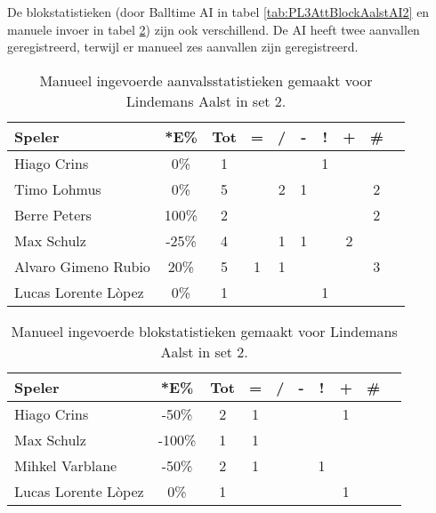 De blokstatistieken (door Balltime AI in tabel \ref{tab:PL3AttBlockAalstAI2} en manuele invoer in tabel \ref{tab:PL3BlockAalstMan2}) zijn ook verschillend. De AI heeft twee aanvallen geregistreerd, terwijl er manueel zes aanvallen zijn geregistreerd. 

\begin{table}[ht!]
    \centering
    \scriptsize
    \begin{tabular}{|l|c|c|c|c|c|c|c|c|c|}
        \hline
        \textbf{Speler} & *E\% & Tot & = & / & - & ! & + & \# \\ \hline
        Hiago Crins & 0\% & 1 &  &  &  & 1 &  & \\ 
        Timo Lohmus & 0\% & 5 &  & 2 & 1 &  & & 2 \\ 
        Berre Peters & 100\% & 2 &  &  & & & & 2 \\ 
        Max Schulz & -25\% & 4 &  & 1 & 1 &  & 2 & \\ 
        Alvaro Gimeno Rubio & 20\% & 5 & 1 & 1 &  &  &  & 3 \\ 
        Lucas Lorente Lòpez & 0\% & 1 &  &  &  & 1 &  & \\ \hline
    \end{tabular}
    \caption[Manueel ingevoerde aanvalsstatistieken gemaakt Lindemans Aalst in set 2]{\label{tab:PL3AttAalstMan2}Manueel ingevoerde aanvalsstatistieken gemaakt voor Lindemans Aalst in set 2.}
\end{table}

\begin{table}[ht!]
    \centering
    \scriptsize
    \begin{tabular}{|l|c|c|c|c|c|c|c|c|c|}
        \hline
        \textbf{Speler} & *E\% & Tot & = & / & - & ! & + & \# \\ \hline
        Hiago Crins & -50\% & 2 & 1 &  &  &  & 1 &  \\
        Max Schulz & -100\% & 1 & 1 &  &  &  &  & \\
        Mihkel Varblane & -50\% & 2 & 1 &  &  & 1 &  & \\
        Lucas Lorente Lòpez & 0\% & 1 &  &  &  &  & 1 & \\ \hline
    \end{tabular}
    \caption[Manueel ingevoerde blokstatistieken gemaakt Lindemans Aalst in set 2]{\label{tab:PL3BlockAalstMan2}Manueel ingevoerde blokstatistieken gemaakt voor Lindemans Aalst in set 2.}
\end{table}

